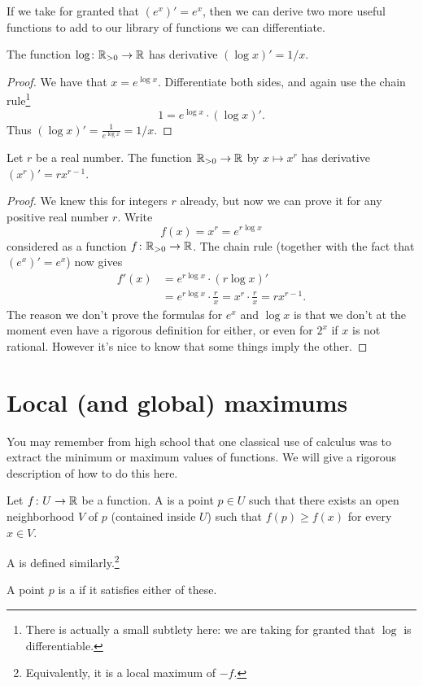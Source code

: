If we take for granted that $(e^x)' = e^x$,
then we can derive two more useful functions
to add to our library of functions we can differentiate.

\begin{corollary}
	The function $\log \colon \mathbb R_{>0} \to \mathbb R$
	has derivative $(\log x)' = 1/x$.
\end{corollary}
\begin{proof}
	We have that $x = e^{\log x}$.
	Differentiate both sides, and again use the chain rule\footnote{There
		is actually a small subtlety here:
		we are taking for granted that $\log$ is differentiable.}
	\[ 1 = e^{\log x} \cdot (\log x)'. \]
	Thus $(\log x)' = \frac{1}{e^{\log x}} = 1/x$.
\end{proof}

\begin{corollary}
	Let $r$ be a real number.
	The function $\mathbb R_{>0} \to \mathbb R$ by $x \mapsto x^r$
	has derivative $(x^r)' = rx^{r-1}$.
\end{corollary}

\begin{proof}
	We knew this for integers $r$ already,
	but now we can prove it for any positive real number $r$.
	Write
	\[ f(x) = x^r = e^{r \log x} \]
	considered as a function $f \colon \mathbb R_{>0} \to \mathbb R$.
	The chain rule (together with the fact that $(e^x)' = e^x$)
	now gives
	\begin{align*}
		f'(x) &= e^{r \log x} \cdot (r \log x)' \\
		&= e^{r \log x} \cdot \frac rx = x^r \cdot \frac rx = rx^{r-1}.
	\end{align*}
	The reason we don't prove the formulas for $e^x$ and $\log x$
	is that we don't at the moment even have a rigorous
	definition for either, or even for $2^x$ if $x$ is not rational.
	However it's nice to know that some things imply the other.
\end{proof}

\section{Local (and global) maximums}
You may remember from high school
that one classical use of calculus
was to extract the minimum or maximum values of functions.
We will give a rigorous description of how to do this here.

\begin{definition}
	Let $f \colon U \to \mathbb R$ be a function.
	A  is a point $p \in U$
	such that there exists an open neighborhood $V$ of $p$ (contained inside $U$)
	such that $f(p) \ge f(x)$ for every $x \in V$.

	A  is defined similarly.\footnote{Equivalently,
		it is a local maximum of $-f$.}
\end{definition}
\begin{definition}
	A point $p$ is a 
	if it satisfies either of these.
\end{definition}

